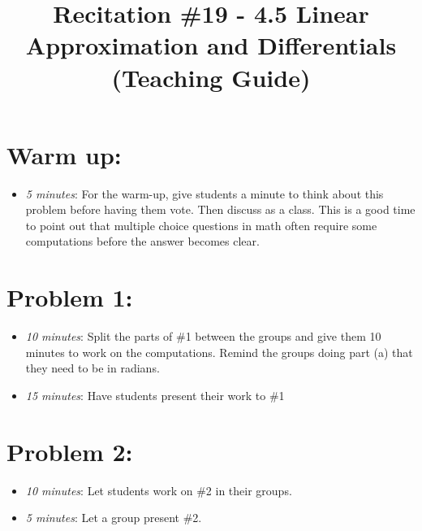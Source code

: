 \documentclass[handout,nooutcomes]{ximera}
\title{Recitation \#19 - 4.5 Linear Approximation and Differentials (Teaching Guide)}
\begin{document}
\begin{abstract}		\end{abstract}
\maketitle


\section*{Warm up:} 
	
	\begin{itemize}
	
	\item  \emph{5 minutes}:  For the warm-up, give students a minute to think about this problem before having them vote.  Then discuss as a class.  This is a good time to point out that multiple choice questions in math often require some computations before the answer becomes clear.
	
	
	
	\end{itemize}


\section*{Problem 1:}

	\begin{itemize}
	
	\item  \emph{10 minutes}:  Split the parts of \#1 between the groups and give them 10 minutes to work on the computations.  Remind the groups doing part (a) that they need to be in radians.
	
	\item  \emph{15 minutes}:  Have students present their work to \#1
	
	\end{itemize}



\section*{Problem 2:}

	\begin{itemize}
	
	\item  \emph{10 minutes}:  Let students work on \#2 in their groups.
		
	\item  \emph{5 minutes}:  Let a group present \#2.
			
	\end{itemize}
	
\end{document}
